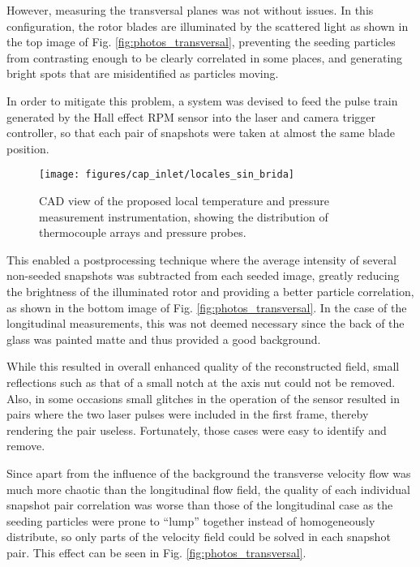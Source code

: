 However, measuring the transversal planes was not without issues. In this configuration, the rotor blades are illuminated by the scattered light as shown in the top image of Fig. \ref{fig:photos_transversal}, preventing the seeding particles from contrasting enough to be clearly correlated in some places, and generating bright spots that are misidentified as particles moving.

In order to mitigate this problem, a system was devised to feed the pulse train generated by the Hall effect RPM sensor into the laser and camera trigger controller, so that each pair of snapshots were taken at almost the same blade position.

\begin{figure}[b!]
\centering
\texttt{[image: figures/cap\_inlet/locales\_sin\_brida]}
\caption{CAD view of the proposed local temperature and pressure measurement instrumentation, showing the distribution of thermocouple arrays and pressure probes.}
\label{fig:metod_local_meas}
\end{figure}

This enabled a postprocessing technique where the average intensity of several non-seeded snapshots was subtracted from each seeded image, greatly reducing the brightness of the illuminated rotor and providing a better particle correlation, as shown in the bottom image of Fig. \ref{fig:photos_transversal}. In the case of the longitudinal measurements, this was not deemed necessary since the back of the glass was painted matte and thus provided a good background.

While this resulted in overall enhanced quality of the reconstructed field, small reflections such as that of a small notch at the axis nut could not be removed. Also, in some occasions small glitches in the operation of the sensor resulted in pairs where the two laser pulses were included in the first frame, thereby rendering the pair useless. Fortunately, those cases were easy to identify and remove.

Since apart from the influence of the background the transverse velocity flow was much more chaotic than the longitudinal flow field, the quality of each individual snapshot pair correlation was worse than those of the longitudinal case as the seeding particles were prone to ``lump'' together instead of homogeneously distribute, so only parts of the velocity field could be solved in each snapshot pair. This effect can be seen in Fig. \ref{fig:photos_transversal}.

